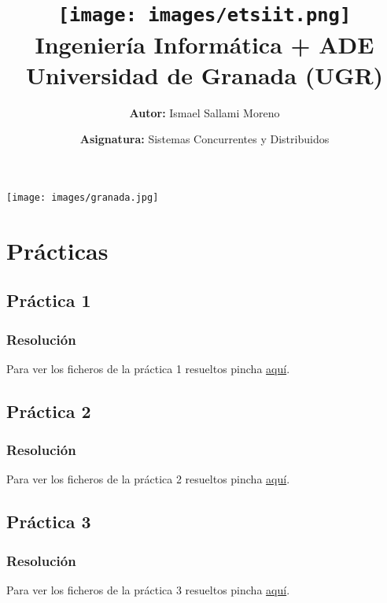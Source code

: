 \documentclass[a4paper,12pt]{article}
\title{
    \vspace{-2cm}
    \texttt{[image: images/etsiit.png]} \\ %
    \LARGE Ingeniería Informática + ADE\\
    \large Universidad de Granada (UGR)\\[1cm]
}
\author{\textbf{Autor:} Ismael Sallami Moreno}
\date{\textbf{Asignatura:} Sistemas Concurrentes y Distribuidos}
\begin{document}
\maketitle
\thispagestyle{empty}

\begin{center}
    \texttt{[image: images/granada.jpg]} \\ %
    \vfill
\end{center}

\newpage

\tableofcontents
\newpage

\section{Prácticas}
\subsection{Práctica 1}

\subsubsection{Resolución}
Para ver los ficheros de la práctica 1 resueltos pincha
\href{https://github.com/ElblogdeIsmael/ElblogdeIsmael.github.io/tree/main/Asignaturas/Tercer%20A%C3%B1o/SCD/Practicas/Practicas_Resueltas/Practica1}{aquí}.

\newpage
\subsection{Práctica 2}

\subsubsection{Resolución}
Para ver los ficheros de la práctica 2 resueltos pincha
\href{https://github.com/ElblogdeIsmael/ElblogdeIsmael.github.io/tree/main/Asignaturas/Tercer%20A%C3%B1o/SCD/Practicas/Practicas_Resueltas/Practica2}{aquí}.

\newpage
\subsection{Práctica 3}

\subsubsection{Resolución}
Para ver los ficheros de la práctica 3 resueltos pincha
\href{https://github.com/ElblogdeIsmael/ElblogdeIsmael.github.io/tree/main/Asignaturas/Tercer%20A%C3%B1o/SCD/Practicas/Practicas_Resueltas/Practica3/scd-p3-fuentes}{aquí}.
\end{document}
